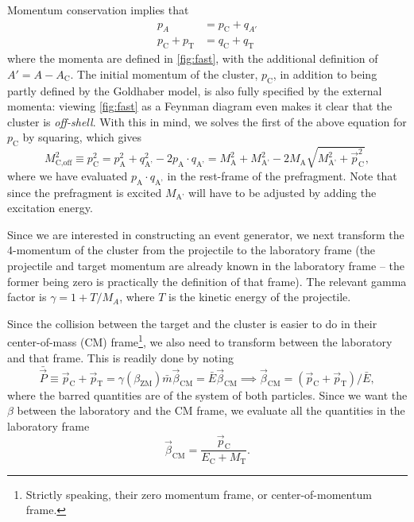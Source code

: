 Momentum conservation implies that
\begin{align}
p_{A} &= p_\text{C} + q_{A'} \\
p_\text{C} + p_\text{T} &= q_\text{C} + q_\text{T}
\end{align}
where the momenta are defined in \autoref{fig:fast}, with the additional definition of $A'=A-A_\text{C}$.
The initial momentum of the cluster, $p_\text{C}$, in addition to being partly defined by the Goldhaber model, is also fully specified by the external momenta: viewing \autoref{fig:fast} as a Feynman diagram even makes it clear that the cluster is \emph{off-shell}.
With this in mind, we solves the first of the above equation for $p_\text{C}$ by squaring, which gives
\begin{equation}
M_\text{C,off}^2 \equiv p_\text{C}^2 = p_\text{A}^2 +  q_\text{A'}^2 -  2p_\text{A}\cdot q_\text{A'} =M_\text{A}^2 + M_\text{A'}^2 - 2M_\text{A}\sqrt{M_\text{A'}^2 + \vec{p}_\text{C}^2},\label{eq:offmass}
\end{equation}
where we have evaluated $p_\text{A}\cdot q_\text{A'}$ in the rest-frame of the prefragment. Note that since the prefragment is excited $M_\text{A'}$ will have to be adjusted by adding the excitation energy.

Since we are interested in constructing an event generator, we next transform the 4-momentum of the cluster from the projectile to the laboratory frame (the projectile and target momentum are already known in the laboratory frame -- the former being zero is practically the definition of that frame). The relevant gamma factor is
$\gamma = 1 + T/M_A$, where $T$ is the kinetic energy of the projectile.

Since the collision between the target and the cluster is easier to do in their center-of-mass (CM) frame\footnote{Strictly speaking, their zero momentum frame, or center-of-momentum frame.}, we also need to transform between the laboratory and that frame. This is readily done by noting
\begin{equation}
\bar{\vec{P}} \equiv \vec{p}_\text{C} + \vec{p}_\text{T} = \gamma(\beta_\text{ZM}) \bar{m} \vec{\beta}_\text{CM} = \bar{E}\vec{\beta}_\text{CM} \implies \vec{\beta}_\text{CM} = (\vec{p}_\text{C} + \vec{p}_\text{T})/\bar{E},
\end{equation}
where the barred quantities are of the system of both particles. Since we want the $\beta$ between the laboratory and the CM frame, we evaluate all the quantities in the laboratory frame
\begin{equation}
\vec{\beta}_\text{CM} = \frac{\vec{p}_\text{C}}{E_\text{C} + M_\text{T}}. \label{eq:betazm}
\end{equation}

